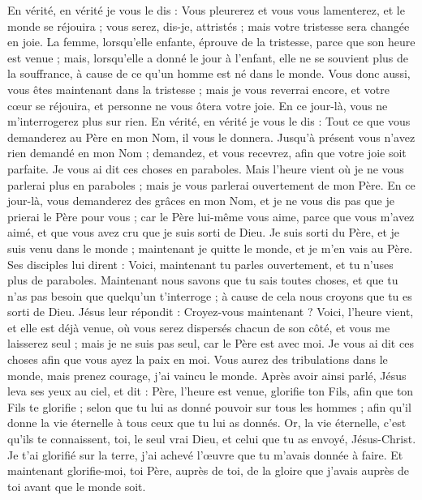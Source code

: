 \begin{multicols}{2}
En vérité, en vérité je vous le dis : Vous pleurerez et vous vous lamenterez, et le monde se réjouira ; vous serez, dis-je, attristés ; mais votre tristesse sera changée en joie.
La femme, lorsqu'elle enfante, éprouve de la tristesse, parce que son heure est venue ; mais, lorsqu'elle a donné le jour à l'enfant, elle ne se souvient plus de la souffrance, à cause de ce qu'un homme est né dans le monde.
Vous donc aussi, vous êtes maintenant dans la tristesse ; mais je vous reverrai encore, et votre cœur se réjouira, et personne ne vous ôtera votre joie.
En ce jour-là, vous ne m'interrogerez plus sur rien. En vérité, en vérité je vous le dis : Tout ce que vous demanderez au Père en mon Nom, il vous le donnera.
Jusqu'à présent vous n'avez rien demandé en mon Nom ; demandez, et vous recevrez, afin que votre joie soit parfaite.
Je vous ai dit ces choses en paraboles. Mais l'heure vient où je ne vous parlerai plus en paraboles ; mais je vous parlerai ouvertement de mon Père.
En ce jour-là, vous demanderez des grâces en mon Nom, et je ne vous dis pas que je prierai le Père pour vous ;
car le Père lui-même vous aime, parce que vous m'avez aimé, et que vous avez cru que je suis sorti de Dieu.
Je suis sorti du Père, et je suis venu dans le monde ; maintenant je quitte le monde, et je m'en vais au Père.
Ses disciples lui dirent : Voici, maintenant tu parles ouvertement, et tu n'uses plus de paraboles.
Maintenant nous savons que tu sais toutes choses, et que tu n'as pas besoin que quelqu'un t'interroge ; à cause de cela nous croyons que tu es sorti de Dieu.
Jésus leur répondit : Croyez-vous maintenant ?
Voici, l'heure vient, et elle est déjà venue, où vous serez dispersés chacun de son côté, et vous me laisserez seul ; mais je ne suis pas seul, car le Père est avec moi.
Je vous ai dit ces choses afin que vous ayez la paix en moi. Vous aurez des tribulations dans le monde, mais prenez courage, j'ai vaincu le monde.
\VerseOne{}Après avoir ainsi parlé, Jésus leva ses yeux au ciel, et dit : Père, l'heure est venue, glorifie ton Fils, afin que ton Fils te glorifie ;
selon que tu lui as donné pouvoir sur tous les hommes ; afin qu'il donne la vie éternelle à tous ceux que tu lui as donnés.
Or, la vie éternelle, c'est qu'ils te connaissent, toi, le seul vrai Dieu, et celui que tu as envoyé, Jésus-Christ.
Je t'ai glorifié sur la terre, j'ai achevé l'œuvre que tu m'avais donnée à faire.
Et maintenant glorifie-moi, toi Père, auprès de toi, de la gloire que j'avais auprès de toi avant que le monde soit.

\end{multicols}
